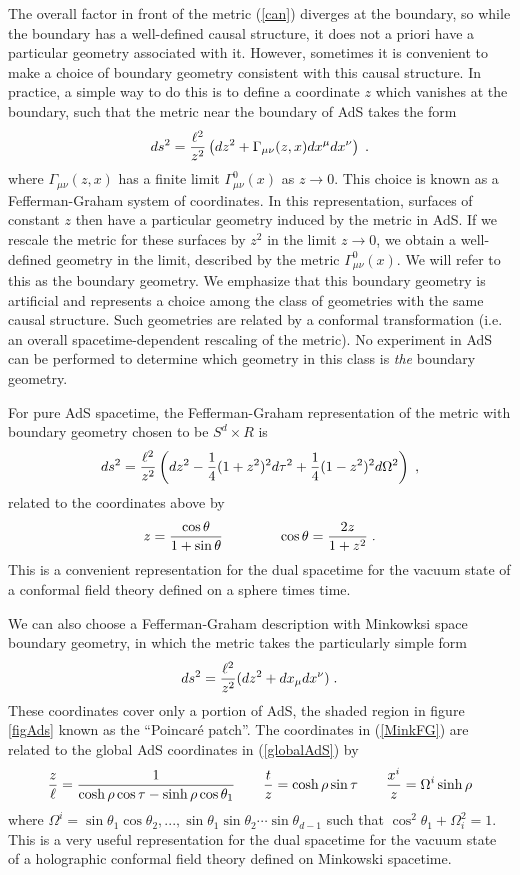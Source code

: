 \documentclass[12pt,epsf]{article}
\newcommand{\be}{\begin{equation}}
\newcommand{\ee}{\end{equation}}
\begin{document}
The overall factor in front of the metric (\ref{can}) diverges at the boundary, so while the boundary has a well-defined causal structure, it does not a priori have a particular geometry associated with it. However, sometimes it is convenient to make a choice of boundary geometry consistent with this causal structure. In practice, a simple way to do this is to define a coordinate $z$ which vanishes at the boundary, such that the metric near the boundary of AdS takes the form
\be
\label{FGapp}
ds^2 = {\ell^2 \over z^2} \left( dz^2 + \Gamma_{\mu \nu}(z,x) dx^\mu dx^\nu \right) \; .
\ee
where $\Gamma_{\mu \nu}(z,x)$ has a finite limit $\Gamma^0_{\mu \nu}(x)$ as $z \to 0$. This choice is known as a Fefferman-Graham system of coordinates. In this representation, surfaces of constant $z$ then have a particular geometry induced by the metric in AdS. If we rescale the metric for these surfaces by $z^2$ in the limit $z \to 0$, we obtain a well-defined geometry in the limit, described by the metric $\Gamma^0_{\mu \nu}(x)$. We will refer to this as the boundary geometry. We emphasize that this boundary geometry is artificial and represents a choice among the class of geometries with the same causal structure. Such geometries are related by a conformal transformation (i.e. an overall spacetime-dependent rescaling of the metric). No experiment in AdS can be performed to determine which geometry in this class is {\it the} boundary geometry.

For pure AdS spacetime, the Fefferman-Graham representation of the metric with boundary geometry chosen to be $S^d \times R$ is
\be
ds^2 = {\ell^2 \over z^2} \left(dz^2 - {1 \over 4} (1 + z^2)^2 d \tau^2 + {1 \over 4} (1 - z^2)^2 d \Omega^2 \right) \; ,
\ee
related to the coordinates above by
\be
z = {\cos \theta \over 1 + \sin \theta} \qquad \qquad \cos \theta = {2 z \over 1 + z^2} \; .
\ee
This is a convenient representation for the dual spacetime for the vacuum state of a conformal field theory defined on a sphere times time.

We can also choose a Fefferman-Graham description with Minkowksi space boundary geometry, in which the metric takes the particularly simple form
\be
\label{MinkFG}
ds^2 = {\ell^2 \over z^2} (dz^2 + dx_\mu dx^\nu) \; .
\ee
These coordinates cover only a portion of AdS, the shaded region in figure \ref{figAds} known as the ``Poincar\'e patch''. The coordinates in (\ref{MinkFG}) are related to the global AdS coordinates in (\ref{globalAdS}) by
\be
{z \over \ell} = {1 \over \cosh \rho \cos \tau - \sinh \rho \cos \theta_1} \qquad {t \over z} = \cosh \rho \sin \tau \qquad {x^i \over z} =\Omega^i \sinh \rho
\ee
where $\Omega^i = \sin \theta_1 \cos \theta_2, ... , \sin \theta_1 \sin \theta_2 \cdots \sin \theta_{d-1}$ such that $\cos^2 \theta_1 + \Omega_i^2 = 1$. This is a very useful representation for the dual spacetime for the vacuum state of a holographic conformal field theory defined on Minkowski spacetime.
\end{document}
